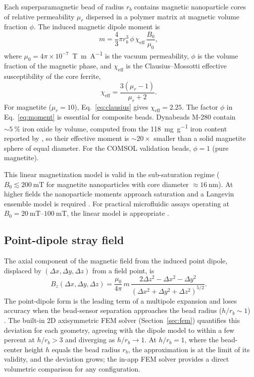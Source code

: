 \documentclass[pdflatex,sn-basic]{sn-jnl}
\theoremstyle{thmstyleone}
\theoremstyle{thmstyletwo}
\theoremstyle{thmstylethree}
\begin{document}
Each superparamagnetic bead of radius $r_b$ contains magnetic nanoparticle cores of relative permeability $\mu_r$ dispersed in a polymer matrix at magnetic volume fraction $\phi$. The induced magnetic dipole moment is
\begin{equation}
m = \frac{4}{3}\pi r_b^3 \, \phi \, \chi_{\text{eff}} \, \frac{B_0}{\mu_0},
\label{eq:moment}
\end{equation}
where $\mu_0 = 4\pi \times 10^{-7}$~\si{\tesla\meter\per\ampere} is the vacuum permeability, $\phi$ is the volume fraction of the magnetic phase, and $\chi_{\text{eff}}$ is the Clausius--Mossotti effective susceptibility of the core ferrite,
\begin{equation}
\chi_{\text{eff}} = \frac{3(\mu_r - 1)}{\mu_r + 2}.
\label{eq:clausius}
\end{equation}
For magnetite ($\mu_r = 10$), Eq.~\eqref{eq:clausius} gives $\chi_{\text{eff}} = 2.25$. The factor $\phi$ in Eq.~\eqref{eq:moment} is essential for composite beads. Dynabeads M-280 contain ${\sim}\SI{5}{\percent}$ iron oxide by volume, computed from the \SI{118}{\milli\gram\per\gram} iron content reported by \citet{fonnum2005}, so their effective moment is ${\sim}20\times$ smaller than a solid magnetite sphere of equal diameter. For the COMSOL validation beads, $\phi = 1$ (pure magnetite).

This linear magnetization model is valid in the sub-saturation regime ($B_0 \lesssim \SI{200}{\milli\tesla}$ for magnetite nanoparticles with core diameter ${\approx}\SI{16}{\nano\meter}$). At higher fields the nanoparticle moments approach saturation and a Langevin ensemble model is required \citep{elfimova2019,henrard2019}. For practical microfluidic assays operating at $B_0 = \SIrange{20}{100}{\milli\tesla}$, the linear model is appropriate \citep{ota2019}.

\subsection{Point-dipole stray field}\label{sec:strayfield}

The axial component of the magnetic field from the induced point dipole, displaced by $(\Delta x, \Delta y, \Delta z)$ from a field point, is \citep{griffiths}
\begin{equation}
B_z(\Delta x, \Delta y, \Delta z) = \frac{\mu_0}{4\pi}\, m\, \frac{2\Delta z^2 - \Delta x^2 - \Delta y^2}{\left(\Delta x^2 + \Delta y^2 + \Delta z^2\right)^{5/2}}.
\label{eq:dipole}
\end{equation}
The point-dipole form is the leading term of a multipole expansion and loses accuracy when the bead-sensor separation approaches the bead radius ($h/r_b \sim 1$) \citep{griffiths}. The built-in 2D axisymmetric FEM solver (Section~\ref{sec:fem}) quantifies this deviation for each geometry, agreeing with the dipole model to within a few percent at $h/r_b > 3$ and diverging as $h/r_b \to 1$. At $h/r_b = 1$, where the bead-center height $h$ equals the bead radius $r_b$, the approximation is at the limit of its validity, and the deviation grows; the in-app FEM solver provides a direct volumetric comparison for any configuration.
\end{document}
